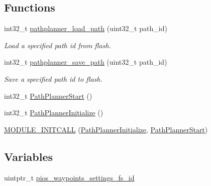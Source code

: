 \subsection*{\-Functions}
\begin{DoxyCompactItemize}
\item 
int32\-\_\-t \hyperlink{group___path_planner_module_ga2601ca435ed04ae19c977a45d56be03c}{pathplanner\-\_\-load\-\_\-path} (uint32\-\_\-t path\-\_\-id)
\begin{DoxyCompactList}\small\item\em \-Load a specified path id from flash. \end{DoxyCompactList}\item 
int32\-\_\-t \hyperlink{group___path_planner_module_ga0652408cf825ce696f667d9137a2f3e4}{pathplanner\-\_\-save\-\_\-path} (uint32\-\_\-t path\-\_\-id)
\begin{DoxyCompactList}\small\item\em \-Save a specified path id to flash. \end{DoxyCompactList}\item 
int32\-\_\-t \hyperlink{group___path_planner_module_gaf0d1956d741a9004d4d88cb38d43b4c4}{\-Path\-Planner\-Start} ()
\item 
int32\-\_\-t \hyperlink{group___path_planner_module_ga851894b7d249ff14f2f5e1a6f294bf35}{\-Path\-Planner\-Initialize} ()
\item 
\hyperlink{group___path_planner_module_ga5614947f71f78546f4d0f379ab2bddaa}{\-M\-O\-D\-U\-L\-E\-\_\-\-I\-N\-I\-T\-C\-A\-L\-L} (\hyperlink{group___path_planner_module_ga851894b7d249ff14f2f5e1a6f294bf35}{\-Path\-Planner\-Initialize}, \hyperlink{group___path_planner_module_gaf0d1956d741a9004d4d88cb38d43b4c4}{\-Path\-Planner\-Start})
\end{DoxyCompactItemize}
\subsection*{\-Variables}
\begin{DoxyCompactItemize}
\item 
uintptr\-\_\-t \hyperlink{group___path_planner_module_ga4b04979e5fb31eaa66088178605835cd}{pios\-\_\-waypoints\-\_\-settings\-\_\-fs\-\_\-id}
\end{DoxyCompactItemize}


